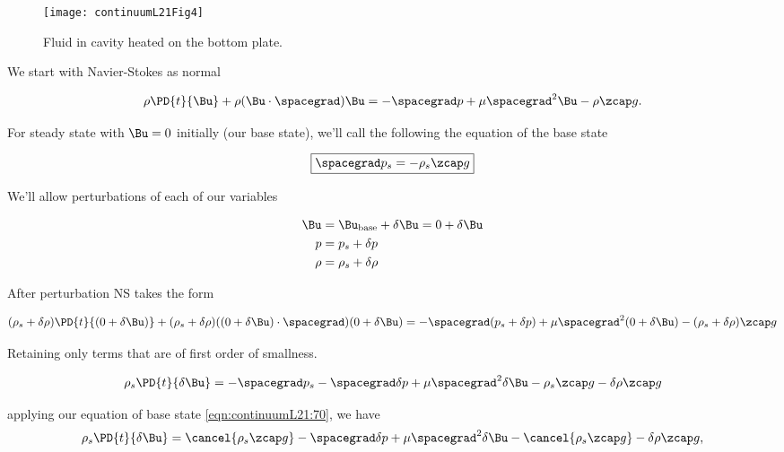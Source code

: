 \begin{figure}[htp]
   \centering
   \texttt{[image: continuumL21Fig4]}
   \caption{Fluid in cavity heated on the bottom plate.}\label{fig:continuumL21:continuumL21Fig4}
\end{figure}

We start with Navier-Stokes as normal

\begin{equation}\label{eqn:continuumL21:50}
\rho \PD{t}{\Bu} + \rho (\Bu \cdot \spacegrad) \Bu = - \spacegrad p + \mu \spacegrad^2 \Bu - \rho \zcap g.
\end{equation}

For steady state with $\Bu = 0$ initially (our base state), we'll call the following the equation of the base state

\begin{equation}\label{eqn:continuumL21:70}
\boxed{
\spacegrad p_s = -\rho_s \zcap g
}
\end{equation}

We'll allow perturbations of each of our variables

\begin{align*}
\Bu &= \Bu_\text{base} + \delta \Bu = 0 + \delta \Bu \\
p &= p_s + \delta p \\
\rho &= \rho_s + \delta \rho
\end{align*}

After perturbation NS takes the form

\begin{equation}\label{eqn:continuumL21:90}
(\rho_s + \delta \rho )\PD{t}{(0 + \delta \Bu)} + (\rho_s + \delta \rho) ((0 + \delta \Bu) \cdot \spacegrad) (0 + \delta \Bu) = - \spacegrad (p_s + \delta p) + \mu \spacegrad^2 (0 + \delta \Bu) - (\rho_s + \delta \rho) \zcap g
\end{equation}

Retaining only terms that are of first order of smallness.

\begin{equation}\label{eqn:continuumL21:110}
\rho_s \PD{t}{\delta \Bu} = - \spacegrad p_s - \spacegrad \delta p + \mu \spacegrad^2 \delta \Bu - \rho_s \zcap g - \delta \rho \zcap g
\end{equation}

applying our equation of base state \ref{eqn:continuumL21:70}, we have
\begin{equation}\label{eqn:continuumL21:110b}
\rho_s \PD{t}{\delta \Bu} = \cancel{\rho_s \zcap g} - \spacegrad \delta p + \mu \spacegrad^2 \delta \Bu - \cancel{\rho_s \zcap g} - \delta \rho \zcap g,
\end{equation}

